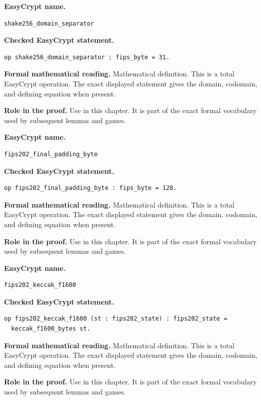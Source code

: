 \begin{formaldefinition}
\noindent\textbf{EasyCrypt name.}
\begin{lstlisting}[language=EasyCrypt,basicstyle=\ttfamily\scriptsize]
shake256_domain_separator
\end{lstlisting}
\noindent\textbf{Checked EasyCrypt statement.}
\begin{lstlisting}[language=EasyCrypt,basicstyle=\ttfamily\scriptsize]
op shake256_domain_separator : fips_byte = 31.
\end{lstlisting}
\noindent\textbf{Formal mathematical reading.}
Mathematical definition. This is a total EasyCrypt operation.  The exact displayed statement gives the domain, codomain, and defining equation when present.

\noindent\textbf{Role in the proof.}
Use in this chapter. It is part of the exact formal vocabulary used by subsequent lemmas and games.

\end{formaldefinition}

\begin{formaldefinition}
\noindent\textbf{EasyCrypt name.}
\begin{lstlisting}[language=EasyCrypt,basicstyle=\ttfamily\scriptsize]
fips202_final_padding_byte
\end{lstlisting}
\noindent\textbf{Checked EasyCrypt statement.}
\begin{lstlisting}[language=EasyCrypt,basicstyle=\ttfamily\scriptsize]
op fips202_final_padding_byte : fips_byte = 128.
\end{lstlisting}
\noindent\textbf{Formal mathematical reading.}
Mathematical definition. This is a total EasyCrypt operation.  The exact displayed statement gives the domain, codomain, and defining equation when present.

\noindent\textbf{Role in the proof.}
Use in this chapter. It is part of the exact formal vocabulary used by subsequent lemmas and games.

\end{formaldefinition}

\begin{formaldefinition}
\noindent\textbf{EasyCrypt name.}
\begin{lstlisting}[language=EasyCrypt,basicstyle=\ttfamily\scriptsize]
fips202_keccak_f1600
\end{lstlisting}
\noindent\textbf{Checked EasyCrypt statement.}
\begin{lstlisting}[language=EasyCrypt,basicstyle=\ttfamily\scriptsize]
op fips202_keccak_f1600 (st : fips202_state) : fips202_state =
  keccak_f1600_bytes st.
\end{lstlisting}
\noindent\textbf{Formal mathematical reading.}
Mathematical definition. This is a total EasyCrypt operation.  The exact displayed statement gives the domain, codomain, and defining equation when present.

\noindent\textbf{Role in the proof.}
Use in this chapter. It is part of the exact formal vocabulary used by subsequent lemmas and games.

\end{formaldefinition}

